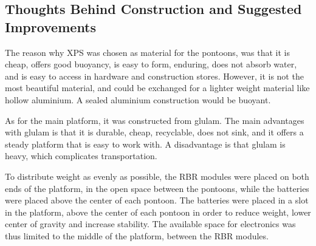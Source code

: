 \subsection{Thoughts Behind Construction and Suggested Improvements}
The reason why XPS was chosen as material for the pontoons, was that it is cheap, offers good buoyancy, is easy to form, enduring, does not absorb water, and is easy to access in hardware and construction stores. However, it is not the most beautiful material, and could be exchanged for a lighter weight material like hollow aluminium. A sealed aluminium construction would be buoyant.

As for the main platform, it was constructed from glulam. The main advantages with glulam is that it is durable, cheap, recyclable, does not sink, and it offers a steady platform that is easy to work with. A disadvantage is that glulam is heavy, which complicates transportation.




To distribute weight as evenly as possible, the RBR modules were placed on both ends of the platform, in the open space between the pontoons, while the batteries were placed above the center of each pontoon. The batteries were placed in a slot in the platform, above the center of each pontoon in order to reduce weight, lower center of gravity and increase stability. The available space for electronics was thus limited to the middle of the platform, between the RBR modules.

